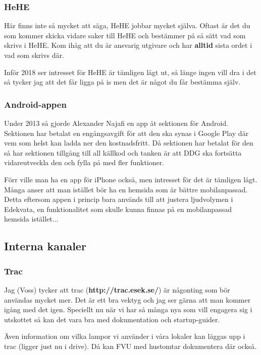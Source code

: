 \documentclass[10pt]{article}
\begin{document}
\subsubsection{HeHE}
Här finns inte så mycket att säga, HeHE jobbar mycket själva. Oftast är det du som kommer skicka vidare saker till HeHE och bestämmer på så sätt vad som skrivs i HeHE. Kom ihåg att du är ansvarig utgivare och har \textbf{alltid} sista ordet i vad som skrivs där.

Inför 2018 ser intresset för HeHE är tämligen lågt ut, så länge ingen vill dra i det så tycker jag att det får ligga på is men det är något du får bestämma själv.

\subsubsection{Android-appen}
Under 2013 så gjorde Alexander Najafi en app åt sektionen för Android. Sektionen har betalat en engångsavgift för att den ska synas i Google Play där vem som helst kan ladda ner den kostnadsfritt. Då sektionen har betalat för den så har sektionen tillgång till all källkod och tanken är att DDG ska fortsätta vidareutveckla den och fylla på med fler funktioner.

Förr ville man ha en app för iPhone också, men intresset för det är tämligen lågt. Många anser att man istället bör ha en hemsida som är bättre mobilanpassad. Detta eftersom appen i princip bara används till att justera ljudvolymen i Edekvata, en funktionalitet som skulle kunna finnas på en mobilanpassad hemsida istället...

\subsection{Interna kanaler}
\subsubsection{Trac}

Jag (Voss) tycker att trac (\textbf{http://trac.esek.se/}) är någonting som bör användas mycket mer. Det är ett bra vektyg och jag ser gärna att man kommer igång med det igen. Speciellt nu när vi har så många nya som vill engagera sig i utskottet så kan det vara bra med dokumentation och startup-guider. 

Även information om vilka lampor vi använder i våra lokaler kan läggas upp i trac (ligger just nu i drive). Då kan FVU med hustomtar dokumentera där också. 
\end{document}
